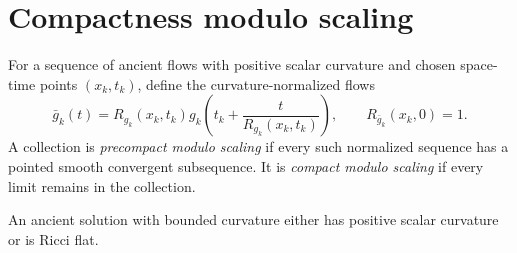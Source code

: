 \section{Compactness modulo scaling}

\begin{definition}
\label{def:chow-iii-compact-modulo-scaling}
For a sequence of ancient flows with positive scalar curvature and chosen
space-time points $(x_k,t_k)$, define the curvature-normalized flows
\[
 \bar g_k(t)=R_{g_k}(x_k,t_k)
 g_k\!\left(t_k+\frac{t}{R_{g_k}(x_k,t_k)}\right),
 \qquad R_{\bar g_k}(x_k,0)=1.
\]
A collection is \emph{precompact modulo scaling} if every such normalized
sequence has a pointed smooth convergent subsequence.  It is \emph{compact
modulo scaling} if every limit remains in the collection.
\end{definition}

\begin{remark}
\label{rem:chow-iii-ancient-positive-or-ricci-flat}
An ancient solution with bounded curvature either has positive scalar
curvature or is Ricci flat.
\end{remark}


